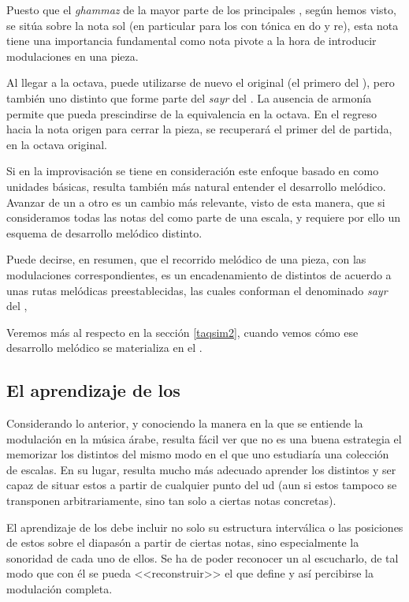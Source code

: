 Puesto que el \emph{ghammaz} de la mayor parte de los principales \maqamaatb, según hemos visto, se sitúa sobre la nota sol (en particular para los \maqamaat con tónica en do y re), esta nota tiene una importancia fundamental como nota pivote a la hora de introducir modulaciones en una pieza.

Al llegar a la octava, puede utilizarse de nuevo el \yins original (el primero del \maqamb), pero también uno distinto que forme parte del \emph{sayr} del \maqamb. La ausencia de armonía permite que pueda prescindirse de la equivalencia en la octava. En el regreso hacia la nota origen para cerrar la pieza, se recuperará el primer \yins del \maqam de partida, en la octava original.

Si en la improvisación se tiene en consideración este enfoque basado en \yins como unidades básicas, resulta también más natural entender el desarrollo melódico. Avanzar de un \yins a otro es un cambio más relevante, visto de esta manera, que si consideramos todas las notas del \maqam como parte de una escala, y requiere por ello un esquema de desarrollo melódico distinto.

Puede decirse, en resumen, que el recorrido melódico de una pieza, con las modulaciones correspondientes, es un encadenamiento de distintos \ashnas de acuerdo a unas rutas melódicas preestablecidas, las cuales conforman el denominado \emph{sayr} del \maqamb,

Veremos más al respecto en la sección \ref{taqsim2}, cuando vemos cómo ese desarrollo melódico se materializa en el \taqsimb.


\subsection{El aprendizaje de los \maqamaat}

Considerando lo anterior, y conociendo la manera en la que se entiende la modulación en la música árabe, resulta fácil ver que no es una buena estrategia el memorizar los distintos \maqamaat del mismo modo en el que uno estudiaría una colección de escalas. En su lugar, resulta mucho más adecuado aprender los distintos \ashnas y ser capaz de situar estos a partir de cualquier punto del ud (aun si estos tampoco se transponen arbitrariamente, sino tan solo a ciertas notas concretas).

El aprendizaje de los \ashnas debe incluir no solo su estructura interválica o las posiciones de estos sobre el diapasón a partir de ciertas notas, sino especialmente la sonoridad de cada uno de ellos. Se ha de poder reconocer un \yins al escucharlo, de tal modo que con él se pueda <<reconstruir>> el \maqam que define y así percibirse la modulación completa.


